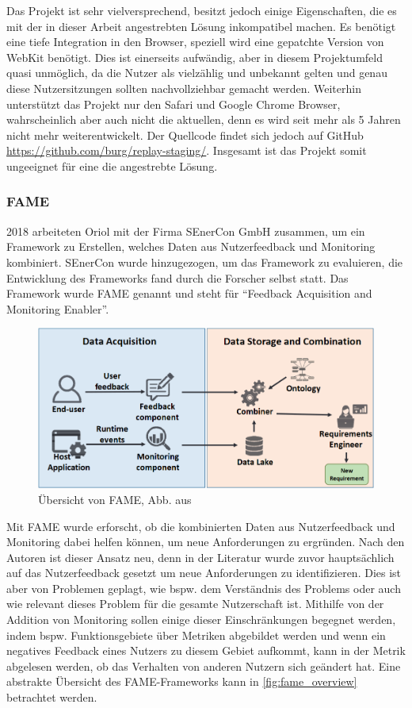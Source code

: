 Das Projekt ist sehr vielversprechend, besitzt jedoch einige Eigenschaften, die es mit der in dieser Arbeit angestrebten Lösung inkompatibel machen. Es benötigt eine tiefe Integration in den Browser, speziell wird eine gepatchte Version von WebKit benötigt. Dies ist einerseits aufwändig, aber in diesem Projektumfeld quasi unmöglich, da die Nutzer als vielzählig und unbekannt gelten und genau diese Nutzersitzungen sollten nachvollziehbar gemacht werden. Weiterhin unterstützt das Projekt nur den Safari und Google Chrome Browser, wahrscheinlich aber auch nicht die aktuellen, denn es wird seit mehr als 5 Jahren nicht mehr weiterentwickelt. Der Quellcode findet sich jedoch auf GitHub \url{https://github.com/burg/replay-staging/}. Insgesamt ist das Projekt somit ungeeignet für eine die angestrebte Lösung.

\subsubsection{FAME}

2018 arbeiteten Oriol \etal \cite{FamePaper} mit der Firma SEnerCon GmbH zusammen, um ein Framework zu Erstellen, welches Daten aus Nutzerfeedback und Monitoring kombiniert. SEnerCon wurde hinzugezogen, um das Framework zu evaluieren, die Entwicklung des Frameworks fand durch die Forscher selbst statt. Das Framework wurde FAME genannt und steht für \enquote{Feedback Acquisition and Monitoring Enabler}.

\begin{figure}
\centering
\includegraphics[width=\linewidth]{img/03_methoden/fame_overview.png}
\caption{Übersicht von FAME, Abb. aus \cite{FamePaper}}
\label{fig:fame_overview}
\end{figure}

Mit FAME wurde erforscht, ob die kombinierten Daten aus Nutzerfeedback und Monitoring dabei helfen können, um neue Anforderungen zu ergründen. Nach den Autoren ist dieser Ansatz neu, denn in der Literatur wurde zuvor hauptsächlich auf das Nutzerfeedback gesetzt um neue Anforderungen zu identifizieren. Dies ist aber von Problemen geplagt, wie bspw. dem Verständnis des Problems oder auch wie relevant dieses Problem für die gesamte Nutzerschaft ist. Mithilfe von der Addition von Monitoring sollen einige dieser Einschränkungen begegnet werden, indem bspw. Funktionsgebiete über Metriken abgebildet werden und wenn ein negatives Feedback eines Nutzers zu diesem Gebiet aufkommt, kann in der Metrik abgelesen werden, ob das Verhalten von anderen Nutzern sich geändert hat. Eine abstrakte Übersicht des FAME-Frameworks kann in \autoref{fig:fame_overview} betrachtet werden.

